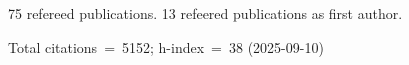 75 refereed publications. 13 refeered publications as first author.

Total citations~=~5152; h-index~=~38 (2025-09-10)